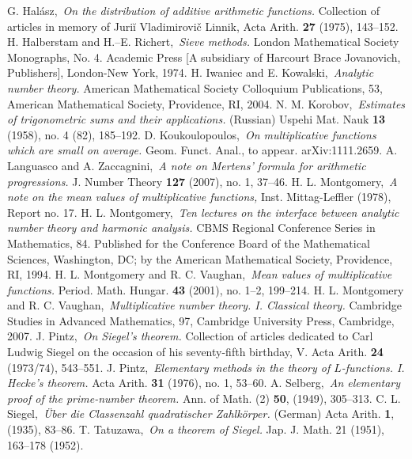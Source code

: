 \documentclass[12pt]{amsart}
\theoremstyle{remark}
\numberwithin{equation}{section}
\begin{document}
\begin{thebibliography}{99}
 G. Hal\'asz,\,
{\sl On the distribution of additive arithmetic functions.} Collection of articles in memory of Juriĭ Vladimirovič Linnik, Acta Arith. {\bf 27} (1975), 143--152.
 H. Halberstam and H.--E. Richert,\,
{\sl Sieve methods.} London Mathematical Society Monographs, No. 4. Academic Press [A subsidiary of Harcourt Brace Jovanovich, Publishers], London-New York, 1974.
 H. Iwaniec and E. Kowalski,\,
{\sl Analytic number theory.} American Mathematical Society Colloquium Publications, 53, American Mathematical Society, Providence, RI, 2004.
 N. M. Korobov,\,
{\sl Estimates of trigonometric sums and their applications.} (Russian) Uspehi Mat. Nauk {\bf 13} (1958), no. 4 (82), 185--192.
 D. Koukoulopoulos,\,
{\sl On multiplicative functions which are small on average.} Geom. Funct. Anal., to appear. arXiv:1111.2659.
 A. Languasco and A. Zaccagnini,\,
{\sl A note on Mertens' formula for arithmetic progressions.} J. Number Theory {\bf 127} (2007), no. 1, 37--46.
 H. L. Montgomery,\,
{\sl A note on the mean values of multiplicative functions,} Inst. Mittag-Leffler (1978), Report no. 17.
 H. L. Montgomery,\,
{\sl Ten lectures on the interface between analytic number theory and harmonic analysis.} CBMS Regional Conference Series in Mathematics, 84. Published for the Conference Board of the Mathematical Sciences, Washington, DC; by the American Mathematical Society, Providence, RI, 1994.
 H. L. Montgomery and R. C. Vaughan,\,
{\sl Mean values of multiplicative functions.} Period. Math. Hungar. {\bf 43} (2001), no. 1--2, 199--214.
 H. L. Montgomery and R. C. Vaughan,\,
{\sl Multiplicative number theory. I. Classical theory.} Cambridge Studies in Advanced Mathematics, 97, Cambridge University Press, Cambridge, 2007.
 J. Pintz,\,
{\sl On Siegel's theorem.} Collection of articles dedicated to Carl Ludwig Siegel on the occasion of his seventy-fifth birthday, V. Acta Arith. {\bf 24} (1973/74), 543--551.
 J. Pintz,\,
{\sl Elementary methods in the theory of $L$-functions. I. Hecke's theorem.}  Acta Arith. {\bf 31}  (1976), no. 1, 53--60.
 A. Selberg,\,
{\sl An elementary proof of the prime-number theorem.} Ann. of Math. (2) {\bf 50}, (1949), 305--313.
 C. L. Siegel,\,
{\sl \"Uber die Classenzahl quadratischer Zahlk\"orper.} (German) Acta Arith. {\bf 1}, (1935), 83--86.
 T. Tatuzawa,\,
{\sl On a theorem of Siegel.} Jap. J. Math. 21 (1951), 163--178 (1952).

\end{thebibliography}
\end{document}
